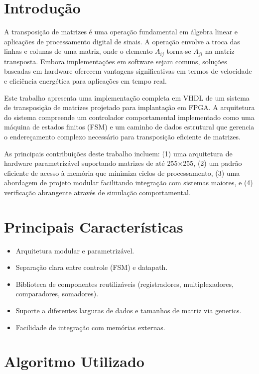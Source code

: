 \documentclass[conference]{IEEEtran}
\begin{document}
\section{Introdução}

A transposição de matrizes é uma operação fundamental em álgebra linear e aplicações de processamento digital de sinais. A operação envolve a troca das linhas e colunas de uma matriz, onde o elemento $A_{ij}$ torna-se $A_{ji}$ na matriz transposta. Embora implementações em software sejam comuns, soluções baseadas em hardware oferecem vantagens significativas em termos de velocidade e eficiência energética para aplicações em tempo real.

Este trabalho apresenta uma implementação completa em VHDL de um sistema de transposição de matrizes projetado para implantação em FPGA. A arquitetura do sistema compreende um controlador comportamental implementado como uma máquina de estados finitos (FSM) e um caminho de dados estrutural que gerencia o endereçamento complexo necessário para transposição eficiente de matrizes.

As principais contribuições deste trabalho incluem: (1) uma arquitetura de hardware parametrizável suportando matrizes de até 255×255, (2) um padrão eficiente de acesso à memória que minimiza ciclos de processamento, (3) uma abordagem de projeto modular facilitando integração com sistemas maiores, e (4) verificação abrangente através de simulação comportamental.

\section{Principais Características}

\begin{itemize}
    \item Arquitetura modular e parametrizável.
    \item Separação clara entre controle (FSM) e datapath.
    \item Biblioteca de componentes reutilizáveis (registradores, multiplexadores, comparadores, somadores).
    \item Suporte a diferentes larguras de dados e tamanhos de matriz via generics.
    \item Facilidade de integração com memórias externas.
\end{itemize}

\section{Algoritmo Utilizado}
\end{document}
